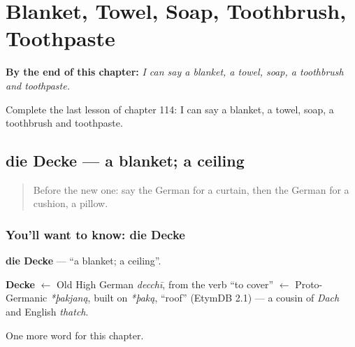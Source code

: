 
\chapter{Blanket, Towel, Soap, Toothbrush, Toothpaste}
\label{ch:ge-blanket-towel-soap-toothbrush-toothpaste}

\begin{chapteropening}
\textbf{By the end of this chapter:} \emph{I can say a blanket, a towel, soap, a toothbrush and toothpaste.}

Complete the last lesson of chapter 114: I can say a blanket, a towel, soap, a toothbrush and toothpaste.
\end{chapteropening}

\section[die Decke]{die Decke — a blanket; a ceiling}

\label{lesson:GE-C114-decke}



\begin{quote}
Before the new one: say the German for a curtain, then the German for a cushion, a pillow.
\end{quote}

\subsection*{You'll want to know: die Decke}
\textbf{die Decke} — \textquotedblleft{}a blanket; a ceiling\textquotedblright{}.

\begin{cousinweb}
\textbf{Decke} $\leftarrow$ Old High German \emph{decchī}, from the verb \textquotedblleft{}to cover\textquotedblright{} $\leftarrow$ Proto-Germanic \emph{*þakjaną}, built on \emph{*þaką}, \textquotedblleft{}roof\textquotedblright{} (EtymDB 2.1) — a cousin of \emph{Dach} and English \emph{thatch}.
\end{cousinweb}

\begin{grammarlens}[title={What you've built}]
One more word for this chapter.
\end{grammarlens}

